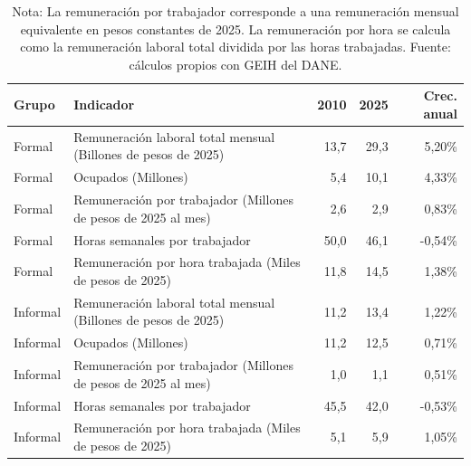 \begin{table}[H]
\centering
\caption{Remuneración laboral por formalidad, 2010--2025}
\label{tab:remuneracion_geih_formalidad}
\footnotesize
\begin{tabular}{@{}p{1.6cm}p{7.0cm}rrr@{}}
\toprule
Grupo & Indicador & 2010 & 2025 & Crec. anual \\
\midrule
Formal & Remuneración laboral total mensual (Billones de pesos de 2025) & 13,7 & 29,3 & 5,20\% \\
Formal & Ocupados (Millones) & 5,4 & 10,1 & 4,33\% \\
Formal & Remuneración por trabajador (Millones de pesos de 2025 al mes) & 2,6 & 2,9 & 0,83\% \\
Formal & Horas semanales por trabajador & 50,0 & 46,1 & -0,54\% \\
Formal & Remuneración por hora trabajada (Miles de pesos de 2025) & 11,8 & 14,5 & 1,38\% \\
Informal & Remuneración laboral total mensual (Billones de pesos de 2025) & 11,2 & 13,4 & 1,22\% \\
Informal & Ocupados (Millones) & 11,2 & 12,5 & 0,71\% \\
Informal & Remuneración por trabajador (Millones de pesos de 2025 al mes) & 1,0 & 1,1 & 0,51\% \\
Informal & Horas semanales por trabajador & 45,5 & 42,0 & -0,53\% \\
Informal & Remuneración por hora trabajada (Miles de pesos de 2025) & 5,1 & 5,9 & 1,05\% \\
\bottomrule
\end{tabular}
\caption*{\footnotesize Nota: La remuneración por trabajador corresponde a una remuneración mensual equivalente en pesos constantes de 2025. La remuneración por hora se calcula como la remuneración laboral total dividida por las horas trabajadas. Fuente: cálculos propios con GEIH del DANE.}
\end{table}
